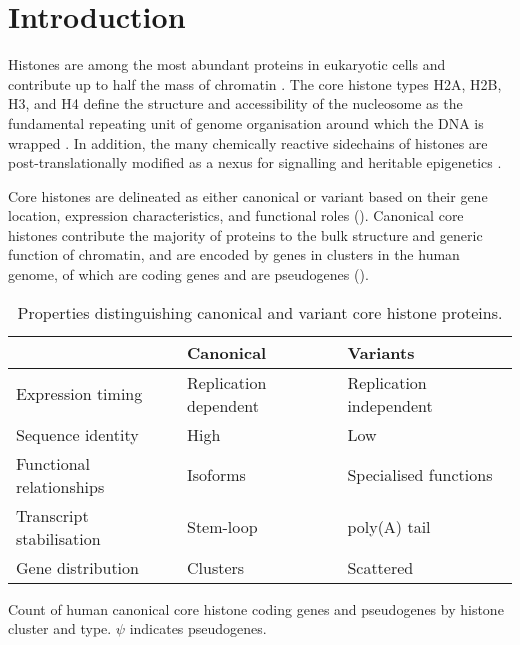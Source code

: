 \section{Introduction}

  Histones are among the most abundant proteins in eukaryotic cells
  and contribute up to half the mass of chromatin \citep{AlbertsMBoC}.
  The core histone types H2A, H2B, H3, and H4
  define the structure and accessibility of the nucleosome
  as the fundamental repeating unit of genome organisation
  around which the DNA is wrapped \citep{Luger1997structure}.
  In addition, the many chemically reactive sidechains of histones
  are post-translationally modified
  as a nexus for signalling and heritable epigenetics \citep{Kouzarides2007}.

  Core histones are delineated as either canonical or variant based on
  their gene location, expression characteristics,
  and functional roles ().
  Canonical core histones contribute the majority of proteins to
  the bulk structure and generic function of chromatin,
  and are encoded by \TotalCoreGenes{} genes in \NumberOfClusters{}
  clusters in the human genome,
  of which \TotalCoreCodingGenes{} are coding genes and \TotalCorePseudoGenes{}
  are pseudogenes ().

  \begin{table}
    \caption{Properties distinguishing canonical and variant core histone proteins.}
    \label{tab:typical-histone-differences}
    \centering
    \begin{tabular}{l l l}
      \toprule
      \null                     & Canonical             & Variants \\
      \midrule
      Expression timing         & Replication dependent & Replication independent \\
      Sequence identity         & High                  & Low \\
      Functional relationships  & Isoforms              & Specialised functions \\
      Transcript stabilisation  & Stem-loop             & poly(A) tail \\
      Gene distribution         & Clusters              & Scattered \\
      \bottomrule
    \end{tabular}
  \end{table}

  \begin{table}
    \caption{Count of human canonical core histone coding genes and pseudogenes
             by histone cluster and type. $\psi$ indicates pseudogenes.}
    \label{tab:histone-gene-count}
    \centering
    
  \end{table}

